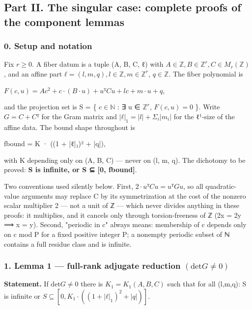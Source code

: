 \documentclass[11pt]{article}
\theoremstyle{plain}
\theoremstyle{definition}
\theoremstyle{remark}
\theoremstyle{plain}
\theoremstyle{definition}
\theoremstyle{remark}
\newcounter{Part}
\theoremstyle{plain}
\theoremstyle{definition}
\theoremstyle{remark}
\begin{document}
\subsection*{Part II. The singular case: complete proofs of the component lemmas}
\subsubsection*{0. Setup and notation}
Fix $r ≥ 0$. A fiber datum is a tuple (A, B, C, ℓ) with $A ∈ ℤ, B ∈ ℤ^{r}, C ∈ M_{r}(ℤ)$, and an affine part $ℓ = (l, m, q), l ∈ ℤ, m ∈ ℤ^{r}$, $q ∈ ℤ$. The fiber polynomial is

$F(c, u) = A c^{2} + c·(B·u) + uᵀCu + l c + m·u + q$,

and the projection set is S = \{ $c ∈ ℕ$ : ∃ u ∈ $ℤ^{r}$, $F(c,u) = 0$ \}. Write $G = C + Cᵀ$ for the Gram matrix and $|ℓ|_{1} = |l| + Σ_{i}|m_{i}|$ for the ℓ¹-size of the affine data. The bound shape throughout is

fbound = K · ((1 + |ℓ|₁)² + |q|),

with K depending only on (A, B, C) — never on (l, m, q). The dichotomy to be proved: \textbf{S is infinite, or S ⊆ [0, fbound]}.

Two conventions used silently below. First, $2·uᵀCu = uᵀGu$, so all quadratic-value arguments may replace C by its symmetrization at the cost of the nonzero scalar multiplier 2 — not a unit of ℤ — which never divides anything in these proofs: it multiplies, and it cancels only through torsion-freeness of ℤ (2x = 2y ⟹ x = y). Second, "periodic in c" always means: membership of c depends only on c mod P for a fixed positive integer P; a nonempty periodic subset of ℕ contains a full residue class and is infinite.

\subsubsection*{1. Lemma 1 — full-rank adjugate reduction $(\mathrm{det} G ≠ 0)$}
\textbf{Statement.} If $\mathrm{det} G ≠ 0$ there is $K_{1} = K_{1}(A,B,C)$ such that for all (l,m,q): S is infinite or $S ⊆ [0, K_{1}·((1+|ℓ|_{1})^{2}+|q|)]$.
\end{document}
